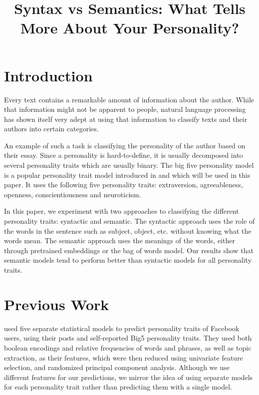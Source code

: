 \documentclass[10pt, a4paper]{article}
\title{Syntax vs Semantics: What Tells More About Your Personality?}
\begin{document}
\maketitleabstract

\section{Introduction}

Every text contains a remarkable amount of information about the author.
While that information might not be apparent to people, natural language processing has shown itself very adept at using that information to classify texts and their authors into certain categories.

An example of such a task is classifying the personality of the author based on their essay.
Since a personality is hard-to-define, it is usually decomposed into several personality traits which are usually binary.
The big five personality model is a popular personality trait model introduced in \citep{digman1990personality} and \citep{goldberg1993structure} which will be used in this paper.
It uses the following five personality traits: extraversion, agreeableness, openness, conscientiousness and neuroticism.

In this paper, we experiment with two approaches to classifying the different personality traits: syntactic and semantic.
The syntactic approach uses the role of the words in the sentence such as subject, object, etc. without knowing what the words mean.
The semantic approach uses the meanings of the words, either through pretrained embeddings or the bag of words model.
Our results show that semantic models tend to perform better than syntactic models for all personality traits.

\section{Previous Work}

\citep{park} used five separate statistical models to predict personality traits of Facebook users, using their posts and self-reported Big5 personality traits.
They used both boolean encodings and relative frequencies of words and phrases, as well as topic extraction, as their features, which were then reduced using univariate feature selection, and randomized principal component analysis.
Although we use different features for our predictions, we mirror the idea of using separate models for each personality trait rather than predicting them with a single model.
\end{document}
